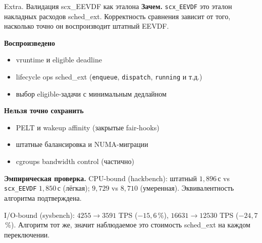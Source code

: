 \documentclass[aspectratio=169,11pt]{beamer}
\begin{document}
\begin{frame}{Extra. Валидация scx\_EEVDF как эталона}
        \footnotesize
        \textbf{Зачем.} \texttt{scx\_EEVDF} это эталон накладных
        расходов sched\_ext. Корректность сравнения зависит от того,
        насколько точно он воспроизводит штатный EEVDF.

        \vspace{0.1cm}
        \textbf{Воспроизведено}
        \begin{itemize}\setlength{\itemsep}{0pt}
                \item vruntime и eligible deadline
                \item lifecycle ops sched\_ext (\texttt{enqueue},
                        \texttt{dispatch}, \texttt{running} и т.д.)
                \item выбор eligible-задачи с минимальным дедлайном
        \end{itemize}

        \vspace{0.05cm}
        \textbf{Нельзя точно сохранить}
        \begin{itemize}\setlength{\itemsep}{0pt}
                \item PELT и wakeup affinity (закрытые fair-hooks)
                \item штатные балансировка и NUMA-миграции
                \item cgroups bandwidth control (частично)
        \end{itemize}

        \vspace{0.1cm}
        \begin{shadowbox}
                \scriptsize
                \textbf{Эмпирическая проверка.}
                CPU-bound (hackbench): штатный $1{,}896$\,с vs
                \texttt{scx\_EEVDF} $1{,}850$\,с (лёгкая); $9{,}729$
                vs $8{,}710$ (умеренная). Эквивалентность алгоритма
                подтверждена.

                \vspace{0.05cm}
                I/O-bound (sysbench): $4255 \to 3591$ TPS
                ($-15{,}6$\,\%), $16631 \to 12530$ TPS
                ($-24{,}7$\,\%). Алгоритм тот же, значит наблюдаемое
                это стоимость sched\_ext на каждом переключении.
        \end{shadowbox}
\end{frame}
\addtocounter{framenumber}{-1}
\end{document}
